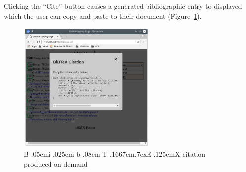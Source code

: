 \documentclass[a4paper,10pt]{SMR}
\def\BibTeX{{\rm B\kern-.05em{\sc i\kern-.025em b}\kern-.08em
    T\kern-.1667em\lower.7ex\hbox{E}\kern-.125emX}}
\begin{document}
Clicking the ``Cite'' button causes a generated bibliographic entry
to displayed which the user can copy and paste to their document
(Figure~\ref{f:cite}).
\begin{figure}
 \begin{center}
  \includegraphics[width=0.6\textwidth]{SMR_page-citation.png}
 \end{center}
 \caption{\BibTeX{} citation produced on-demand}
 \label{f:cite}
\end{figure}
\end{document}
